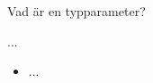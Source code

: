 
\ifkompendium\else


\begin{Slide}{Vad är en typparameter?}
\begin{multicols}{2}
...
\columnbreak

\begin{itemize}
\pause
\item ...

\end{itemize}
\end{multicols}
\end{Slide}


\fi






